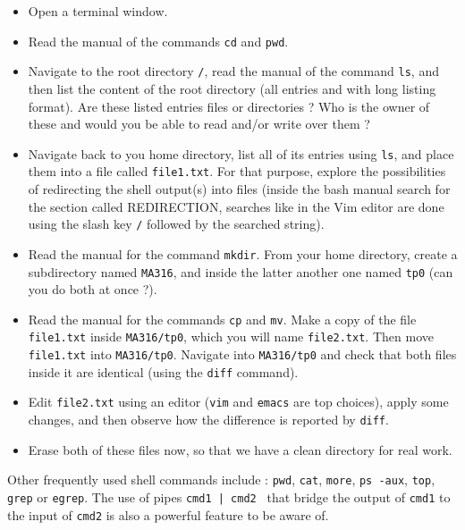 \documentclass[a4paper,12pt]{article}
\begin{document}
 
\begin{itemize}

\item[1)] Open a terminal window.

\item[2)] Read the manual of the commands \texttt{cd} and \texttt{pwd}. 

\item[3)] Navigate to the root directory \texttt{/}, read the manual of the command \texttt{ls}, and then list the content of the root directory (all entries and with long listing format). Are these listed entries files or directories ? Who is the owner of these and would you be able to read and/or write over them ?

\item[4)] Navigate back to you home directory, list all of its entries using {\tt ls}, and place them into a file called {\tt file1.txt}. For that purpose, explore the possibilities of redirecting the shell output(s) into files (inside the bash manual search for the section called REDIRECTION, searches like in the Vim editor are done using the slash key {\tt /} followed by the searched string).

\item[5)] Read the manual for the command {\tt mkdir}. From your home directory,
	create a subdirectory named {\tt MA316}, and inside the latter another one named {\tt tp0} (can you do both at once ?).

\item[6)] Read the manual for the commands {\tt cp} and {\tt mv}. Make a copy of
	the file {\tt file1.txt} inside {\tt MA316/tp0}, which you will name
		{\tt file2.txt}. Then move {\tt file1.txt} into {\tt MA316/tp0}.
		Navigate into {\tt MA316/tp0} and check that both files inside it are identical (using the {\tt diff} command).   

\item[7)] Edit {\tt file2.txt} using an editor ({\tt vim} and {\tt emacs} are top choices), apply some changes, and then observe how the difference is reported by {\tt diff}.

\item[8)] Erase both of these files now, so that we have a clean directory for real work. 

\end{itemize}

\noindent Other frequently used shell commands include : {\tt pwd}, {\tt cat}, {\tt more}, {\tt ps -aux}, {\tt top}, {\tt grep} or {\tt egrep}. The use of pipes {\tt cmd1 | cmd2 } that bridge the output of {\tt cmd1} to the input of {\tt cmd2} is also a powerful feature to be aware of. 
\end{document}

